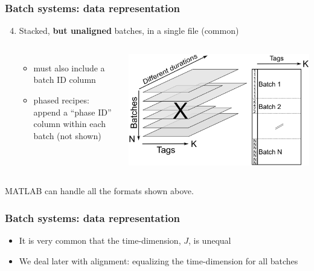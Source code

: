 \begin{frame}\frametitle{Batch systems: data representation}

\begin{enumerate}
	\setcounter{enumi}{3}
	\item	Stacked, \textbf{but unaligned} batches, in a single file (common)
			
			\begin{columns}
					\begin{itemize}
						\item	must also include a batch ID column

						\item	phased recipes: append a ``phase ID'' column within each batch (not shown)
					\end{itemize}
					
				
					\begin{center}
						\includegraphics[width=\textwidth]{images/batch-data-layers-into-page-and-unfolded.png}
					\end{center}
					
			\end{columns}
\end{enumerate}
MATLAB can handle all the formats shown above.
\end{frame}

\begin{frame}\frametitle{Batch systems: data representation}
	
	\begin{itemize}
		\item	It is very common that the time-dimension, \( J \), is unequal	
		
		\item	We deal later with alignment: equalizing the time-dimension for all batches
	\end{itemize}
\end{frame}

